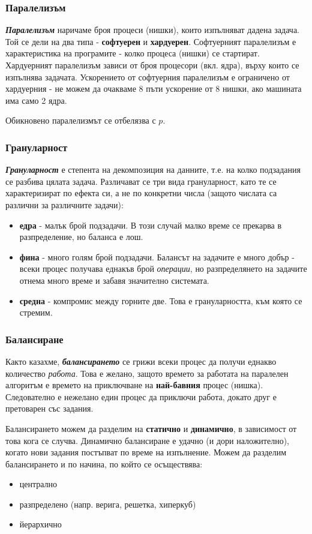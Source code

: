 \documentclass{scrartcl}
\begin{document}
\begin{FlushLeft}
\subsubsection{Паралелизъм}
\textbf{\textit{Паралелизъм}} наричаме броя процеси (нишки), които изпълняват дадена задача.
Той се дели на два типа - \textbf{софтуерен} и \textbf{хардуерен}. Софтуерният паралелизъм е 
характеристика на програмите - колко процеса (нишки) се стартират. Хардуерният паралелизъм 
зависи от броя процесори (вкл. ядра), върху които се изпълнява задачата.
Ускорението от софтуерния паралелизъм е ограничено от хардуерния - не можем да очакваме 
8 пъти ускорение от 8 нишки, ако машината има само 2 ядра.

Обикновено паралелизмът се отбелязва с $p$.

\subsubsection{Грануларност}
\textbf{\textit{Грануларност}} е степента на декомпозиция на данните, т.е. на колко подзадания се разбива цялата задача.
Различават се три вида грануларност, като те се характеризират по ефекта си, а не по конкретни числа (защото 
числата са различни за различните задачи):
\begin{itemize}
    \item \textbf{едра} - малък брой подзадачи. В този случай малко време се прекарва в разпределение, но баланса е лош.
    \item \textbf{фина} - много голям брой подзадачи. Балансът на задачите е много добър - всеки процес получава еднакъв брой 
    \textit{операции}, но разпределянето на задачите отнема много време и забавя значително системата.
    \item \textbf{средна} - компромис между горните две. Това е грануларността, към която се стремим.
\end{itemize}

\subsubsection{Балансиране}
Както казахме, \textbf{\textit{балансирането}} се грижи всеки процес да получи еднакво количество \textit{работа}.
Това е желано, защото времето за работата на паралелен алгоритъм е времето на приключване на \textbf{най-бавния} процес (нишка).
Следователно е нежелано един процес да приключи работа, докато друг е претоварен със задания.

Балансирането можем да разделим на \textbf{статично} и \textbf{динамично}, в зависимост от това кога се случва.
Динамично балансиране е удачно (и дори наложително), когато нови задания постъпват по време на изпълнение.
Можем да разделим балансирането и по начина, по който се осъществява:
\begin{itemize}
    \item централно 
    \item разпределено (напр. верига, решетка, хиперкуб)
    \item йерархично
\end{itemize}


\end{FlushLeft}
\end{document}
